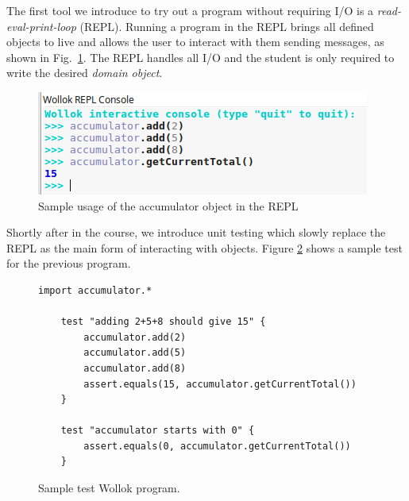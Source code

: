 The first tool we introduce to try out a program without requiring I/O is a \emph {read-eval-print-loop} (REPL). Running a program in the REPL brings all defined objects to live and allows the user to interact with them sending messages, as shown in Fig.~\ref{fig:repl}. 
The REPL handles all I/O and the student is only required to write the desired \emph{domain object}.

\begin{figure}[ht]
 \centering
 \includegraphics[scale=0.6]{images/accumulator-repl.png}
 \caption{\small Sample usage of the accumulator object in the REPL}
 \label{fig:repl}
\end{figure}




Shortly after in the course, we introduce unit testing which slowly replace the REPL as the main form of interacting with objects. Figure \ref{fig:test} shows a sample test for the previous program. 

\vspace{-3mm}
\begin{figure}[ht]
 \centering
 \begin{lstlisting}[language=Wollok]
 	import accumulator.*

	test "adding 2+5+8 should give 15" {
		accumulator.add(2)
		accumulator.add(5)
		accumulator.add(8)
		assert.equals(15, accumulator.getCurrentTotal())		
	}
   
	test "accumulator starts with 0" {
		assert.equals(0, accumulator.getCurrentTotal())
	}\end{lstlisting}
\vspace{-3mm}
\caption{\small Sample test Wollok program.}
\label{fig:test}
\end{figure}

